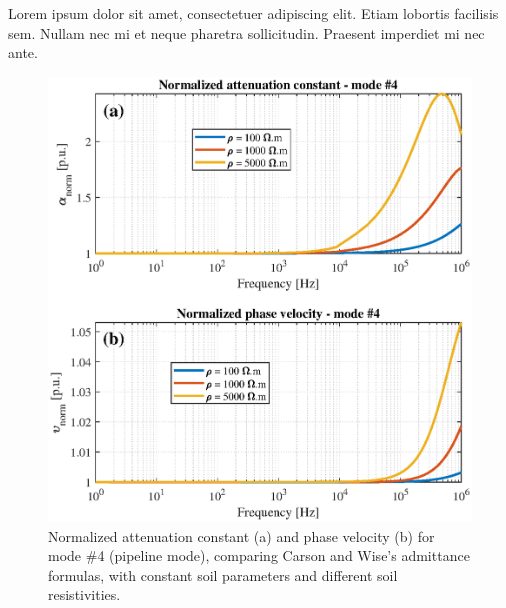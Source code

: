 \documentclass[lettersize,journal]{IEEEtran}
\newcommand*{\shortblindtext}{Lorem ipsum dolor sit amet, consectetuer adipiscing elit. Etiam lobortis facilisis sem. Nullam nec mi et neque pharetra sollicitudin. Praesent imperdiet mi nec ante.}
\begin{document}
\shortblindtext
\begin{figure}[tbh]
	\centering
	\label{fig:WiseCarson___rho___CP_mode4}
	\includegraphics[width=1\columnwidth]{./fig/WiseCarson___rho___CP_mode4.eps}
	\caption{Normalized attenuation constant (a) and phase velocity (b) for mode \#4 (pipeline mode), comparing Carson and Wise's admittance formulas, with constant soil parameters and different soil resistivities.}
\end{figure}
\end{document}
